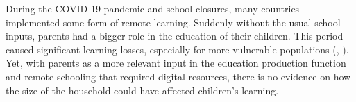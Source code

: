 



During the COVID-19 pandemic and school closures, many countries implemented some form of remote learning. Suddenly without the usual school inputs,  parents had a bigger role in the education of their children. This period caused significant learning losses, especially for more vulnerable populations (\cite{haelermans_inequality_2022}, \cite{jakubowski_global_2023}). Yet, with parents as a more relevant input in the education production function and remote schooling that required digital resources, there is no evidence on how the size of the household could have affected children's learning.














